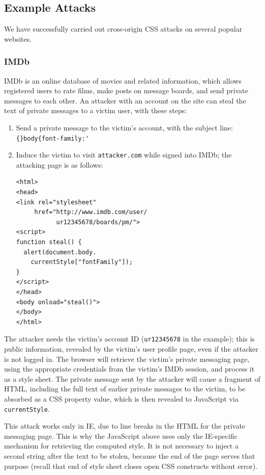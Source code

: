 \documentclass{sig-alternate}
\begin{document}
\subsection{Example Attacks} \label{sec:demos}
We have successfully carried out cross-origin CSS attacks on several
popular websites.

\subsubsection{IMDb}
IMDb is an online database of movies and related information, which
allows registered users to rate films, make posts on message boards,
and send private messages to each other.  An attacker with an account
on the site can steal the text of private messages to a victim user,
with these steps:

\begin{enumerate}
\item Send a private message to the victim's account, with the subject
  line: \verb|{}body{font-family:'|
\item Induce the victim to visit \texttt{attacker.com} while signed
  into IMDb; the attacking page is as follows:
\begin{verbatim}
<html>
<head>
<link rel="stylesheet"
     href="http://www.imdb.com/user/
           ur12345678/boards/pm/">
<script>
function steal() {
  alert(document.body.
    currentStyle["fontFamily"]);
}
</script>
</head>
<body onload="steal()">
</body>
</html>
\end{verbatim}
\end{enumerate}

The attacker needs the victim's account ID (\texttt{ur12345678} in
the example); this is public information, revealed by the victim's
user profile page, even if the attacker is not logged in.  The browser
will retrieve the victim's private messaging page, using the
appropriate credentials from the victim's IMDb session, and process it
as a style sheet.  The private message sent by the attacker will cause
a fragment of HTML, including the full text of earlier private
messages to the victim, to be absorbed as a CSS property value, which
is then revealed to JavaScript via \texttt{currentStyle}.

This attack works only in IE, due to line breaks in the HTML for the
private messaging page.  This is why the JavaScript above uses only
the IE-specific mechanism for retrieving the computed style.  It is
not necessary to inject a second string after the text to be stolen,
because the end of the page serves that purpose (recall that end of
style sheet closes open CSS constructs without error).
\end{document}
